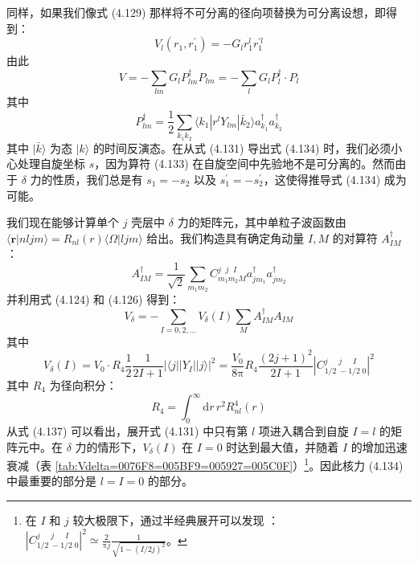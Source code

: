 同样，如果我们像式 (4.129) 那样将不可分离的径向项替换为可分离设想，即得到：
\begin{equation}
V_{l}(r_{1},r^{\prime}_{1})=-G_{l}r^{l}_{1}r^{\prime l}_{1}\label{eq:4.133}
\end{equation}
由此
\begin{equation}
V=-\sum_{lm}G_{l}P^{\dagger}_{lm}P_{lm}=-\sum_{l}G_{l}P^{\dagger}_{l}\cdot P_{l}\label{eq:4.134}
\end{equation}
其中
\begin{equation}
P^{\dagger}_{lm}=\frac{1}{2}\sum_{k_{1}k_{2}}\langle k_{1}|r^{l}Y_{lm}|\bar{k}_{2}\rangle a^{\dagger}_{k_{1}}a^{\dagger}_{k_{2}}\label{eq:4.135}
\end{equation}
其中 $|\bar{k}\rangle$ 为态 $|k\rangle$ 的时间反演态。在从式 (4.131) 导出式 (4.134)
时，我们必须小心处理自旋坐标 $s$，因为算符 (4.133) 在自旋空间中先验地不是可分离的。然而由于 $\delta$ 力的性质，我们总是有
$s_{1}=-s_{2}$ 以及 $s^{\prime}_{1}=-s^{\prime}_{2}$，这使得推导式 (4.134)
成为可能。

我们现在能够计算单个 $j$ 壳层中 $\delta$ 力的矩阵元，其中单粒子波函数由 $\langle\boldsymbol{r}|nljm\rangle=R_{nl}(r)\langle\Omega|ljm\rangle$
给出。我们构造具有确定角动量 $I,M$ 的对算符 $A^{\dagger}_{IM}$：
\begin{equation}
A^{\dagger}_{IM}=\frac{1}{\sqrt{2}}\sum_{m_{1}m_{2}}C^{j\;\;j\;\;I}_{m_{1}m_{2}M}a^{\dagger}_{jm_{1}}a^{\dagger}_{jm_{2}}\label{eq:4.136}
\end{equation}
并利用式 (4.124) 和 (4.126) 得到：
\begin{equation}
V_{\delta}=-\sum_{I=0,2,\ldots}V_{\delta}(I)\sum_{M}A^{\dagger}_{IM}A_{IM}\label{eq:4.137a}
\end{equation}
其中
\begin{equation}
V_{\delta}(I)=V_{0}\cdot R_{4}\frac{1}{2}\frac{1}{2I+1}|\langle j||Y_{I}||j\rangle|^{2}=\frac{V_{0}}{8\mathrm{\pi}}R_{4}\frac{(2j+1)^{2}}{2I+1}\left|C^{j\;\;\;\;\;j\;\;\;\;\;I}_{1/2\;-1/2\;0}\right|^{2}\label{eq:4.137}
\end{equation}
其中 $R_{4}$ 为径向积分：
\begin{equation}
R_{4}=\int^{\infty}_{0}\mathrm{d}r\,r^{2}R^{4}_{nl}(r)
\end{equation}
从式 (4.137) 可以看出，展开式 (4.131) 中只有第 $l$ 项进入耦合到自旋 $I=l$ 的矩阵元中。在 $\delta$
力的情形下，$V_{\delta}(I)$ 在 $I=0$ 时达到最大值，并随着 $I$ 的增加迅速衰减（表 \ref{tab:Vdelta=0076F8=005BF9=005927=005C0F}）\footnote{在 $I$ 和 $j$ 较大极限下，通过半经典展开可以发现 \cite{MJB75}：$\left|C^{j\;\;\;\;\;j\;\;\;\;\;I}_{1/2\;-1/2\;0}\right|^{2}\simeq\frac{2}{\mathrm{\pi}j}\frac{1}{\sqrt{1-(I/2j)^{2}}}$。}。因此核力
(4.134) 中最重要的部分是 $l=I=0$ 的部分。

